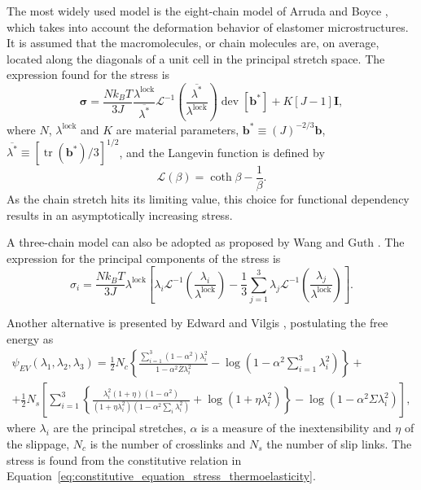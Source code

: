 The most widely used model is the eight-chain model of Arruda and Boyce \citep{arrudaEvolutionPlasticAnisotropy1993, arrudaEffectsStrainRate1995}, which takes into account the deformation behavior of elastomer microstructures.
It is assumed that the macromolecules, or chain molecules are, on average, located along the diagonals of a unit cell in the principal stretch space.
The expression found for the stress is
\begin{equation}
	\label{eq:eigth_chain_model}
	\bm \sigma = \frac{Nk_BT}{3J} \frac{\lambda^\text{lock}}{\overline{\lambda^*}}\mathcal L^{-1}\left(\frac{\overline{\lambda^*}}{\lambda^\text{lock}}\right)\operatorname{dev} [\bm b^*] + K [J-1]\bm I,
\end{equation}
where $N$, $\lambda^\text{lock}$ and $K$ are material parameters, $\bm b^*\equiv (J)^{-2/3}\bm b$, $\overline{\lambda^*}\equiv [\operatorname{tr}(\bm b^*)/3]^{1/2}$, and the Langevin function is defined by
\begin{equation}
	\mathcal L(\beta) = \coth \beta - \frac{1}{\beta}.
\end{equation}
As the chain stretch hits its limiting value, this choice for functional dependency results in an asymptotically increasing stress.

A three-chain model can also be adopted as proposed by Wang and Guth \citep{wangStatisticalTheoryNetworks1952}.
The expression for the principal components of the stress is
\begin{equation}
	\label{eq:three_chain_model}
	\sigma_i=\frac{Nk_B T}{3J} \lambda^\text{lock} \left[\lambda_i \mathcal L^{-1}\left(\frac{\lambda_i}{\lambda^\text{lock}}\right) - \frac{1}{3} \sum_{j=1}^3 \lambda_j \mathcal L^{-1}\left(\frac{\lambda_j}{\lambda^\text{lock}}\right)\right].
\end{equation}

Another alternative is presented by Edward and Vilgis \citep{edwardsEffectEntanglementsRubber1986}, postulating the free energy as
\begin{multline}
  \label{eq:edward_vilgis_model}
	\psi_{EV}(\lambda_1, \lambda_2, \lambda_3) = \frac{1}{2} N_c\left\{\frac{\sum_{i=1}^3\left(1-\alpha^2\right) \lambda_i^2}{1-\alpha^2 \bar{Z} \lambda_i^2}-\log \left(1-\alpha^2 \sum_{i=1}^3 \lambda_i^2\right)\right\}+ \\
	+\frac{1}{2} N_s\left[\sum_{i=1}^3\left\{\frac{\lambda_i^2(1+\eta)\left(1-\alpha^2\right)}{\left(1+\eta \lambda_i^2\right)\left(1-\alpha^2 \sum_i \lambda_i^2\right)}+\log \left(1+\eta \lambda_i^2\right)\right\}-\log \left(1-\alpha^2 \Sigma \lambda_i^2\right)\right],
\end{multline}
where $\lambda_i$ are the principal stretches, $\alpha$ is a measure of the inextensibility and $\eta$ of the slippage, $N_c$ is the number of crosslinks and $N_s$ the number of slip links.
The stress is found from the constitutive relation in Equation~\eqref{eq:constitutive_equation_stress_thermoelasticity}.


